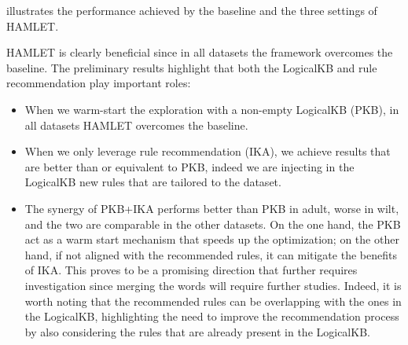 \documentclass[5p,times]{elsarticle}
\newcommand{\mf}[1]{#1}
\begin{document}
 illustrates the performance achieved by the baseline and the three settings of HAMLET.
\mf{
HAMLET is clearly beneficial since in all datasets the framework overcomes the baseline.
The preliminary results highlight that both the LogicalKB and rule recommendation play important roles:
}
\begin{itemize}
    \item \mf{When we warm-start the exploration with a non-empty LogicalKB (PKB), in all datasets HAMLET overcomes the baseline.}

    \item \mf{When we only leverage rule recommendation (IKA)}, we achieve results that are better than or equivalent to PKB, indeed we are injecting in the LogicalKB new rules that are tailored to the dataset.
    
    \item 
    \mf{
    The synergy of PKB+IKA performs better than PKB in adult, worse in wilt, and the two are comparable in the other datasets.
    On the one hand, the PKB act as a warm start mechanism that speeds up the optimization; on the other hand, if not aligned with the recommended rules, it can mitigate the benefits of IKA.
    This proves to be a promising direction that further requires investigation since merging the words will require further studies.
    Indeed, it is worth noting that the recommended rules can be overlapping with the ones in the LogicalKB, highlighting the need to improve the recommendation process by also considering the rules that are already present in the LogicalKB.
    }
\end{itemize}
\end{document}
